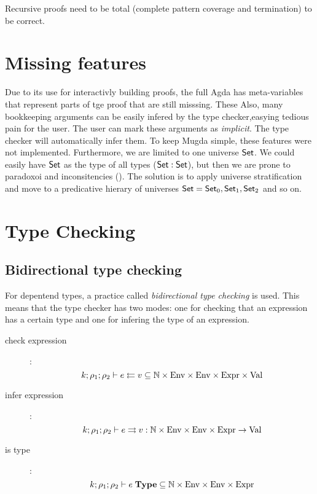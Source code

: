 Recursive proofs need to be total (complete pattern coverage and termination) to be correct.

\section{Missing features}
Due to its use for interactivly building proofs, the full Agda has meta-variables that represent parts of tge proof that are still misssing. These 
Also, many bookkeeping arguments can be easily infered by the type checker,easying tedious pain for the user.
The user can mark these arguments as \emph{implicit}. The type checker will automatically infer them.
To keep Mugda simple, these features were not implemented.
Furthermore, we are limited to one universe $\mathsf{Set}$.
We could easily have $\mathsf{Set}$ as the type of all types ($\mathsf{Set} : \mathsf{Set}$), but then we are prone to paradoxoi and inconsitencies (\cite{coquand86analysis,coquand92pattern}).
The solution is to apply universe stratification and move to a predicative hierary of universes $ \mathsf{Set} = \mathsf{Set}_0 , \mathsf{Set}_1 , \mathsf{Set}_2 $ and so on. 
\section{Type Checking}

\renewcommand\Check[5]{#1;#2;#3\vdash#4\leftleftarrows#5}
\newcommand\IsType[4]{#1;#2;#3\vdash#4\;\mathbf{Type}}
\newcommand\DataType[5]{#1;#2;#3;#4\vdash#5\;\mathbf{DataType}}
\newcommand\ConType[5]{#1;#2;#3;#4\vdash#5\;\mathbf{ConType}}
\newcommand\Infer[5]{#1;#2;#3\vdash#4\rightrightarrows#5}
\newcommand\EqVal[4]{#1;#2\vdash#3\Leftrightarrow#4}
\newcommand\FeqVal[4]{#1;#2\vdash#3{\;\leftrightarrow\;}#4}
\newcommand\DeqVal[2]{\vdash#1\leftrightarrow#2}
\newcommand\LeqVal[4]{#1;#2;\vdash#3\leq#4}
\newcommand\FleqVal[4]{#1;#2\vdash#3{\;\ll\;}#4}
\newcommand\DLeqVal[2]{\vdash#1\leq#2}
\newcommand\SzLeq[2]{\vdash#1\sqsubseteq#2}

\subsection{Bidirectional type checking} 
For depentend types, a practice called \emph{bidirectional type checking} is used.
This means that the type checker has two modes:
one for checking that an expression has a certain type and one for infering the type of an expression.

\begin{description}
\item[check expression]:
\[\Check{k}{\rho_1}{\rho_2}{e}{v} \subseteq \cN \times \Env \times \Env \times \Expr \times \Val\]
\item[infer expression]:
\[\Infer{k}{\rho_1}{\rho_2}{e}{v} : \cN \times \Env \times \Env \times \Expr \ra \Val\]
\item[is type]:
\[\IsType{k}{\rho_1}{\rho_2}{e} \subseteq \cN \times \Env \times \Env \times \Expr \]
\end{description}

